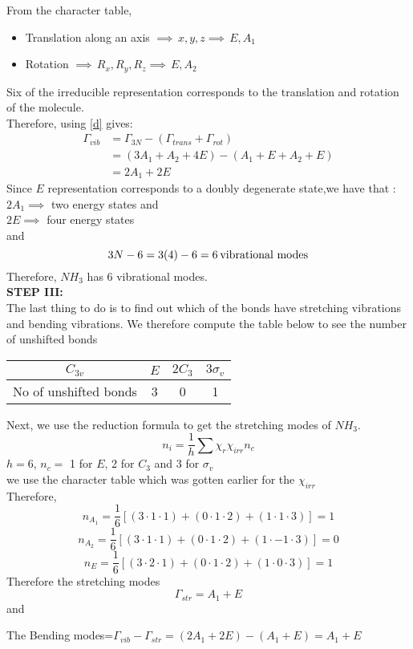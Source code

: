 \documentclass[a4paper, 12pt, openany]{report}
\begin{document}
 From the character table, 
 \begin{itemize}
 	\item Translation along an axis $\implies\,x,y,z\implies\, E, A_1$
 	\item Rotation $\implies\,R_x,R_y,R_z\implies\,E, A_2$
 \end{itemize}
 Six of the irreducible representation corresponds to the translation and \break rotation of the molecule.\\
 Therefore, using \ref{d} gives:
\begin{align*}\Gamma_{vib}&=\Gamma_{3N}-(\Gamma_{trans}+\Gamma_{rot})\\ &=(3A_1+A_2+4E)-(A_1+E+A_2+E)\\
&=2A_1+2E
 \end{align*}
Since $E$ representation corresponds to a doubly degenerate state,we have that :
$2A_1 \implies$ two energy states and \\
$2E \implies $ four energy states\\
  and $$3N-6=3(4)-6=6\hspace{0.07cm} \text{vibrational modes}$$
  Therefore, $NH_3$ has 6 vibrational modes.\\
  
 \textbf{STEP III:}\\
 The last thing to do is to find out which of the bonds have stretching \break vibrations and bending vibrations.  We therefore compute the table below to see the number of unshifted bonds
 \begin{table}[H]\centering\begin{tabular}{|c|c|c|c|}\hline
 		$C_{3v}$&$E$&$2C_3$&$3\sigma_v$\\\hline
 		No of unshifted bonds&3&0&1\\\hline
 \end{tabular}\end{table} 
 Next, we use the reduction formula to get the stretching modes of $NH_3$.
 $$n_i=\frac{1}{h}\sum\chi_r\chi_{irr}n_c$$
 $h=6$, $n_c=$ 1 for $E$, 2 for $C_3$  and 3 for $\sigma_v$\\
 we use the character table which was gotten earlier for the $\chi_{irr}$ \\Therefore,
 $$n_{A_1}=\frac{1}{6}[(3\cdot1\cdot1)+(0\cdot1\cdot2)+(1\cdot1\cdot3)]=1$$
 $$n_{A_2}=\frac{1}{6}[(3\cdot1\cdot1)+(0\cdot1\cdot2)+(1\cdot-1\cdot3)]=0$$
 $$n_E=\frac{1}{6}[(3\cdot2\cdot1)+(0\cdot1\cdot2)+(1\cdot0\cdot3)]=1$$ 
Therefore the stretching modes $$\Gamma_{str}= A_1+E$$ and
\begin{center}The Bending modes=$\Gamma_{vib}-\Gamma_{str}=(2A_1+2E)-(A_1+E)=A_1+E$\end{center}
  	
\end{document}
